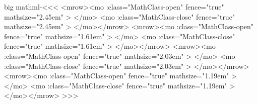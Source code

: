 {{{{{{\<big mathml-\><<<
   {\bgroup
          {<mrow><mo \mml:class="MathClass-open" 
                     fence="true" mathsize="2.45em" >}
          {</mo>}
          {}%
   }
   {\egroup}
   {\bgroup
          {<mo \mml:class="MathClass-close"
                     fence="true" mathsize="2.45em" >}
          {</mo></mrow>}
          {}%
   }
   {\egroup}
   {\bgroup
          {<mrow><mo \mml:class="MathClass-open"
                     fence="true" mathsize="1.61em" >}
          {</mo>}
          {}%
   }
   {\egroup}
   {\bgroup
          {<mo \mml:class="MathClass-close"
                     fence="true" mathsize="1.61em" >}
          {</mo></mrow>}
          {}%
   }
   {\egroup}
   {\bgroup
          {<mrow><mo \mml:class="MathClass-open"
                     fence="true" mathsize="2.03em" >}
          {</mo>}
          {}%
   }
   {\egroup}
   {\bgroup
          {<mo \mml:class="MathClass-close"
                     fence="true" mathsize="2.03em" >}
          {</mo></mrow>}
          {}%
   }
   {\egroup}
   {\bgroup
          {<mrow><mo \mml:class="MathClass-open"
                     fence="true" mathsize="1.19em" >}
          {</mo>}
          {}%
   }
   {\egroup}
   {\bgroup
          {<mo \mml:class="MathClass-close"
                     fence="true" mathsize="1.19em" >}
          {</mo></mrow>}
          {}%
   }
   {\egroup}
>>>



}}}}}}
